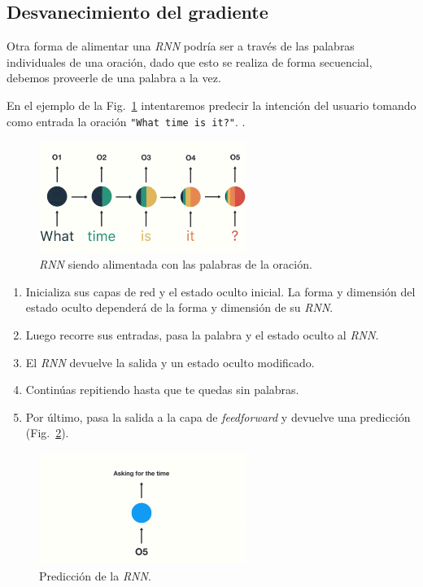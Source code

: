 \documentclass[a4paper,12pt]{article}
\begin{document}
\subsection{Desvanecimiento del gradiente}

Otra forma de alimentar una \textit{RNN} podría ser a través de las palabras individuales de una oración, dado que esto se realiza de forma secuencial, debemos proveerle de una palabra a la vez.

En el ejemplo de la Fig.~\ref{fig:rnnvanishing1} intentaremos predecir la intención del usuario tomando como entrada la oración \texttt{"What time is it?"}. \citep{phi:rnn}.

\begin{figure}[H]
	\begin{center}				
	\includegraphics[width=0.6\textwidth]{vanishing1.png}
  	\caption{\textit{RNN} siendo alimentada con las palabras de la oración.}
  	\label{fig:rnnvanishing1}
  	\end{center}
\end{figure}

\begin{enumerate}
	\item Inicializa sus capas de red y el estado oculto inicial. La forma y dimensión del estado oculto dependerá de la forma y dimensión de su \textit{RNN}.
	\item Luego recorre sus entradas, pasa la palabra y el estado oculto al \textit{RNN}.
	\item El \textit{RNN} devuelve la salida y un estado oculto modificado.
	\item Continúas repitiendo hasta que te quedas sin palabras.
	\item Por último, pasa la salida a la capa de \textit{feedforward} y devuelve una predicción (Fig.~\ref{fig:rnnvanishing2}).
\end{enumerate}

\begin{figure}[H]
	\begin{center}				
	\includegraphics[width=0.6\textwidth]{vanishing2.png}
  	\caption{Predicción de la \textit{RNN}.}
  	\label{fig:rnnvanishing2}
  	\end{center}
\end{figure}
\end{document}
